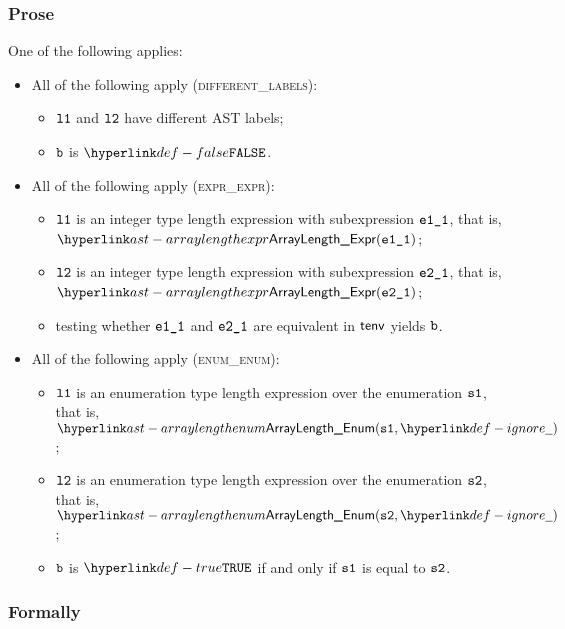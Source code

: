 \subsubsection{Prose}
One of the following applies:
\begin{itemize}
  \item All of the following apply (\textsc{different\_labels}):
  \begin{itemize}
    \item $\texttt{l1}$ and $\texttt{l2}$ have different AST labels;
    \item $\texttt{b}$ is $\False$.
  \end{itemize}

  \item All of the following apply (\textsc{expr\_expr}):
  \begin{itemize}
    \item $\texttt{l1}$ is an integer type length expression with subexpression $\texttt{e1\_1}$, that is, \\ $\ArrayLengthExpr(\veoneone)$;
    \item $\texttt{l2}$ is an integer type length expression with subexpression $\texttt{e2\_1}$, that is, \\ $\ArrayLengthExpr(\vetwoone)$;
    \item testing whether $\texttt{e1\_1}$ and $\texttt{e2\_1}$ are equivalent in $\textsf{tenv}$ yields $\texttt{b}$\ProseOrTypeError.
  \end{itemize}

  \item All of the following apply (\textsc{enum\_enum}):
  \begin{itemize}
    \item $\texttt{l1}$ is an enumeration type length expression over the enumeration $\texttt{s1}$, that is, $\ArrayLengthEnum(\vsone, \Ignore)$;
    \item $\texttt{l2}$ is an enumeration type length expression over the enumeration $\texttt{s2}$, that is, $\ArrayLengthEnum(\vstwo, \Ignore)$;
    \item $\texttt{b}$ is $\True$ if and only if $\texttt{s1}$ is equal to $\texttt{s2}$.
  \end{itemize}
\end{itemize}

\subsubsection{Formally}

